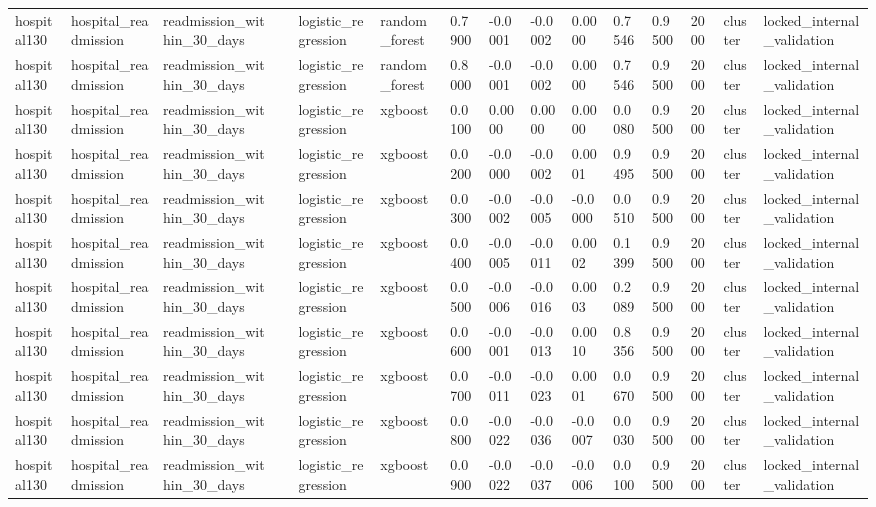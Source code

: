\begin{tabular}{lllllllllllllll}
hospital130 & hospital\_readmission & readmission\_within\_30\_days &  & logistic\_regression & random\_forest & 0.7900 & -0.0001 & -0.0002 & 0.0000 & 0.7546 & 0.9500 & 2000 & cluster & locked\_internal\_validation \\
hospital130 & hospital\_readmission & readmission\_within\_30\_days &  & logistic\_regression & random\_forest & 0.8000 & -0.0001 & -0.0002 & 0.0000 & 0.7546 & 0.9500 & 2000 & cluster & locked\_internal\_validation \\
hospital130 & hospital\_readmission & readmission\_within\_30\_days &  & logistic\_regression & xgboost & 0.0100 & 0.0000 & 0.0000 & 0.0000 & 0.0080 & 0.9500 & 2000 & cluster & locked\_internal\_validation \\
hospital130 & hospital\_readmission & readmission\_within\_30\_days &  & logistic\_regression & xgboost & 0.0200 & -0.0000 & -0.0002 & 0.0001 & 0.9495 & 0.9500 & 2000 & cluster & locked\_internal\_validation \\
hospital130 & hospital\_readmission & readmission\_within\_30\_days &  & logistic\_regression & xgboost & 0.0300 & -0.0002 & -0.0005 & -0.0000 & 0.0510 & 0.9500 & 2000 & cluster & locked\_internal\_validation \\
hospital130 & hospital\_readmission & readmission\_within\_30\_days &  & logistic\_regression & xgboost & 0.0400 & -0.0005 & -0.0011 & 0.0002 & 0.1399 & 0.9500 & 2000 & cluster & locked\_internal\_validation \\
hospital130 & hospital\_readmission & readmission\_within\_30\_days &  & logistic\_regression & xgboost & 0.0500 & -0.0006 & -0.0016 & 0.0003 & 0.2089 & 0.9500 & 2000 & cluster & locked\_internal\_validation \\
hospital130 & hospital\_readmission & readmission\_within\_30\_days &  & logistic\_regression & xgboost & 0.0600 & -0.0001 & -0.0013 & 0.0010 & 0.8356 & 0.9500 & 2000 & cluster & locked\_internal\_validation \\
hospital130 & hospital\_readmission & readmission\_within\_30\_days &  & logistic\_regression & xgboost & 0.0700 & -0.0011 & -0.0023 & 0.0001 & 0.0670 & 0.9500 & 2000 & cluster & locked\_internal\_validation \\
hospital130 & hospital\_readmission & readmission\_within\_30\_days &  & logistic\_regression & xgboost & 0.0800 & -0.0022 & -0.0036 & -0.0007 & 0.0030 & 0.9500 & 2000 & cluster & locked\_internal\_validation \\
hospital130 & hospital\_readmission & readmission\_within\_30\_days &  & logistic\_regression & xgboost & 0.0900 & -0.0022 & -0.0037 & -0.0006 & 0.0100 & 0.9500 & 2000 & cluster & locked\_internal\_validation \\

\end{tabular}
